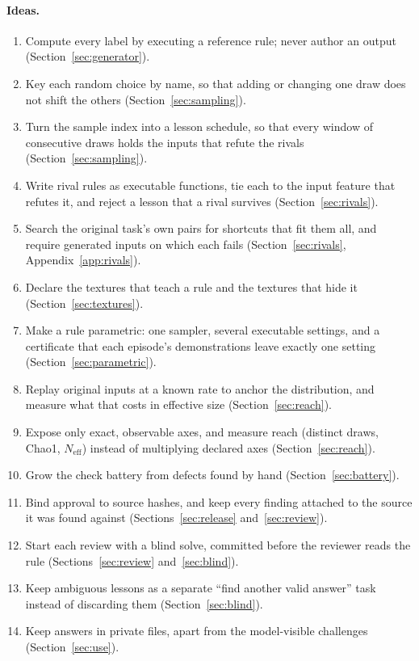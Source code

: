 \documentclass[11pt]{article}
\begin{document}
\paragraph{Ideas.}
\begin{enumerate}[nosep,leftmargin=1.6em]
  \item Compute every label by executing a reference rule; never author an output (Section~\ref{sec:generator}).
  \item Key each random choice by name, so that adding or changing one draw does not shift the others (Section~\ref{sec:sampling}).
  \item Turn the sample index into a lesson schedule, so that every window of consecutive draws holds the inputs that refute the rivals (Section~\ref{sec:sampling}).
  \item Write rival rules as executable functions, tie each to the input feature that refutes it, and reject a lesson that a rival survives (Section~\ref{sec:rivals}).
  \item Search the original task's own pairs for shortcuts that fit them all, and require generated inputs on which each fails (Section~\ref{sec:rivals}, Appendix~\ref{app:rivals}).
  \item Declare the textures that teach a rule and the textures that hide it (Section~\ref{sec:textures}).
  \item Make a rule parametric: one sampler, several executable settings, and a certificate that each episode's demonstrations leave exactly one setting (Section~\ref{sec:parametric}).
  \item Replay original inputs at a known rate to anchor the distribution, and measure what that costs in effective size (Section~\ref{sec:reach}).
  \item Expose only exact, observable axes, and measure reach (distinct draws, Chao1, $N_{\mathrm{eff}}$) instead of multiplying declared axes (Section~\ref{sec:reach}).
  \item Grow the check battery from defects found by hand (Section~\ref{sec:battery}).
  \item Bind approval to source hashes, and keep every finding attached to the source it was found against (Sections~\ref{sec:release} and~\ref{sec:review}).
  \item Start each review with a blind solve, committed before the reviewer reads the rule (Sections~\ref{sec:review} and~\ref{sec:blind}).
  \item Keep ambiguous lessons as a separate ``find another valid answer'' task instead of discarding them (Section~\ref{sec:blind}).
  \item Keep answers in private files, apart from the model-visible challenges (Section~\ref{sec:use}).
\end{enumerate}
\end{document}
